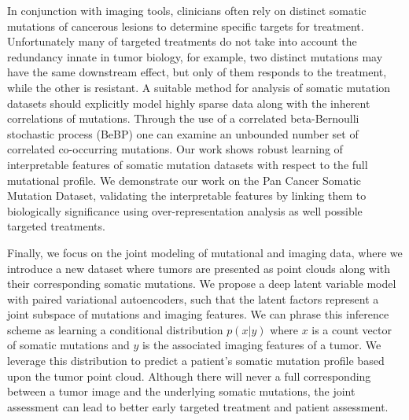 In conjunction with imaging tools, clinicians often rely on distinct somatic mutations of cancerous lesions to determine specific targets for treatment.  Unfortunately many of targeted treatments do not take into account the redundancy innate in tumor biology, for example, two distinct mutations may have the same downstream effect, but only of them responds to the treatment, while the other is resistant.  A suitable method for analysis of somatic mutation datasets should explicitly model highly sparse data along with the inherent correlations of mutations. Through the use of a correlated beta-Bernoulli stochastic process (BeBP) one can examine an unbounded number set of correlated co-occurring mutations.  Our work shows robust learning of interpretable features of somatic mutation datasets with respect to the full mutational profile.  We demonstrate our work on the Pan Cancer Somatic Mutation Dataset, validating the interpretable features by linking them to biologically significance using over-representation analysis as well possible targeted treatments.

Finally, we focus on the joint modeling of mutational and imaging data, where we introduce a new dataset where tumors are presented as point clouds along with their corresponding somatic mutations.  We propose a deep latent variable model with paired variational autoencoders, such that the latent factors represent a joint subspace of mutations and imaging features.  We can phrase this inference scheme as learning a conditional distribution $p(x|y)$ where $x$ is a count vector of somatic mutations and $y$ is the associated imaging features of a tumor.  We leverage this distribution to predict a patient's somatic mutation profile based upon the tumor point cloud. Although there will never a full corresponding between a tumor image and the underlying somatic mutations, the joint assessment can lead to better early targeted treatment and patient assessment.


